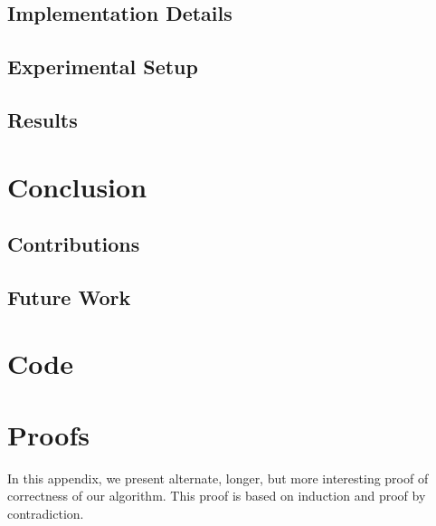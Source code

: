 \documentclass[fyp]{socreport}
\begin{document}
\section{Implementation Details}
\section{Experimental Setup}
\section{Results}

\chapter{Conclusion}
\section{Contributions}
\section{Future Work}




\appendix
\chapter{Code}

\chapter{Proofs}
In this appendix, we present alternate, longer, but more interesting proof 
of correctness of our algorithm.  This proof is based on induction and proof
by contradiction.
\end{document}
